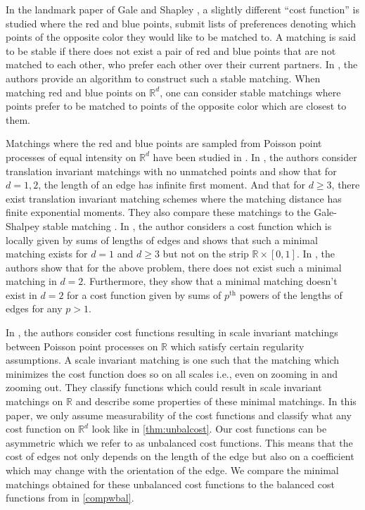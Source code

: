 \documentclass{article}
\newcommand{\R}{\mathbb{R}}
\begin{document}
In the landmark paper of Gale and Shapley \cite{galeshapley}, a slightly different ``cost
function'' is studied where the red and blue points, submit lists of
preferences denoting which points of the opposite color they would
like to be matched to. A matching is said to be stable if there does
not exist a pair of red and blue points that are not matched to each other, who
prefer each other over their current partners. In \cite{galeshapley},
the authors provide
an algorithm to construct such a stable matching. When matching red and blue points on
$\R^d$, one can consider stable matchings where points prefer to be
matched to points of the opposite color which are closest to them.

Matchings where the red and blue points are sampled from Poisson point
processes of equal intensity on $\R^d$ have been studied in
\cite{holroyd2003trees,hpps,timar23,hmo24,minimal,h}.
In \cite{hpps},
the authors consider translation invariant matchings with no unmatched
points and show that for $d=1,2$, the length of an edge has infinite
first moment. And that for $d\geq 3$, there exist translation invariant matching schemes
where the matching distance has finite exponential moments. They also
compare these matchings to the Gale-Shalpey stable matching
\cite{galeshapley}.
  In \cite{h}, the author considers a cost function which is
  locally given by sums of lengths of edges and shows that such a minimal
  matching exists for $d=1$ and $d\geq 3$ but not on the strip
  $\R\times[0,1]$. In \cite{hmo24}, the authors show that for the
  above problem, there does not exist such a minimal matching in
  $d=2$. Furthermore, they show that a minimal matching doesn't exist
  in $d=2$ for a cost function given by sums of $p^{\mbox{th}}$ powers
  of the lengths of edges for any $p>1$.

In \cite{minimal}, the authors consider cost functions resulting in scale invariant matchings
between Poisson point processes on $\R$ which satisfy certain
regularity assumptions. A scale invariant matching is
one such that the matching which minimizes the cost function does so
on all scales i.e., even on zooming in and zooming out. They classify
functions which could result in scale invariant matchings on $\R$ and
describe some properties of these minimal matchings. In this paper, we only assume measurability
of the cost functions and classify what any cost function on $\R^d$
 look like in \cref{thm:unbalcost}. Our cost functions can be
asymmetric which we refer to as unbalanced cost functions. This means
that the cost of edges not only depends on the length of the edge but
also on a coefficient which may change with the orientation of the
edge. We compare the minimal matchings obtained for these unbalanced
cost functions to the balanced cost functions from \cite{minimal} in
\cref{compwbal}.
\end{document}
